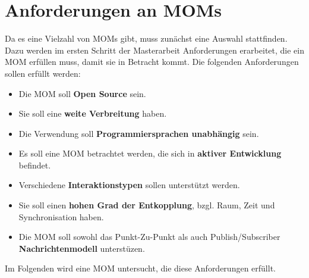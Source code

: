 \section{Anforderungen an MOMs}
\label{sec:anforderungenMom}
Da es eine Vielzahl von MOMs gibt, muss zunächst eine Auswahl stattfinden. Dazu werden im ersten Schritt der Masterarbeit Anforderungen erarbeitet, die ein MOM erfüllen muss, damit sie in Betracht kommt. Die folgenden Anforderungen sollen erfüllt werden:
\begin{itemize}
\item Die MOM soll \textbf{Open Source} sein.
\item Sie soll eine \textbf{weite Verbreitung} haben.
\item Die Verwendung soll \textbf{Programmiersprachen unabhängig} sein.
\item Es soll eine MOM betrachtet werden, die sich in \textbf{aktiver Entwicklung} befindet.
\item Verschiedene \textbf{Interaktionstypen} sollen unterstützt werden.
\item Sie soll einen \textbf{hohen Grad der Entkopplung}, bzgl. Raum, Zeit und Synchronisation haben.
\item Die MOM soll sowohl das Punkt-Zu-Punkt als auch Publish/Subscriber \textbf{Nachrichtenmodell} unterstüzen.
\end{itemize}

Im Folgenden wird eine MOM untersucht, die diese Anforderungen erfüllt.

